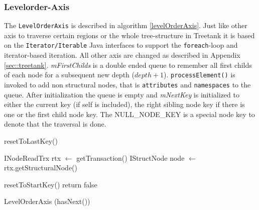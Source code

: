 \subsubsection{Levelorder-Axis}\label{subsubsec::levelorderaxis}
The \texttt{LevelOrderAxis} is described in algorithm \ref{levelOrderAxis}. Just like other axis to traverse certain regions or the whole tree-structure in Treetank it is based on the \texttt{Iterator/Iterable} Java interfaces to support the \texttt{foreach}-loop and iterator-based iteration. All other axis are changed as described in Appendix \ref{sec::treetank}. \emph{mFirstChilds} is a double ended queue to remember all first childs of each node for a subsequent new depth ($depth + 1$). \texttt{processElement()} is invoked to add non structural nodes, that is \texttt{attributes} and \texttt{namespaces} to the queue. After initialization the queue is empty and \emph{mNextKey} is initialized to either the current key (if self is included), the right sibling node key if there is one or the first child node key. The NULL\_NODE\_KEY is a special node key to denote that the traversal is done.

\begin{algorithm}[Hhtbp]
{}
\BlankLine
{}
  
resetToLastKey()\;

INodeReadTrx rtx $\leftarrow$ getTransaction()\;
IStructNode node $\leftarrow$ rtx.getStructuralNode()\;






resetToStartKey()\;
return false\;
\caption{LevelOrderAxis (hasNext())}\label{levelOrderAxis}
\end{algorithm}

